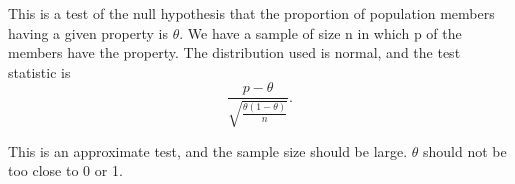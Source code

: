  This is a test of the null hypothesis that the proportion of
population members having a given property is $ \theta . $ We have 
a sample of size n in which p of the members have the property. The
distribution used is normal, and the test statistic is
\[ \frac{p - \theta }{\sqrt{ \frac{\theta ( 1 - \theta ) }{n} } } . \]
\par
This is an approximate test, and the sample size should be large. 
$ \theta $ should not be too close to 0 or 1.
